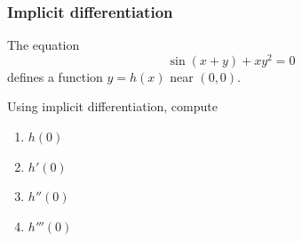 \documentclass[14pt]{beamer}
\begin{document}
	\begin{frame}[t]
		\frametitle{Implicit differentiation}

		The equation
		\[
			\sin (x+y) + xy^{2}= 0
		\]
		defines a function $\displaystyle y=h(x)$ near $(0,0)$. \href{https://www.desmos.com/calculator/bvupq00r6s}{}

		Using implicit differentiation, compute
		\begin{multicols}{4}
			\begin{enumerate}
				\item $\displaystyle h(0)$

				\item $\displaystyle h'(0)$

				\item $\displaystyle h''(0)$

				\item $\displaystyle h'''(0)$
			\end{enumerate}
		\end{multicols}
	\end{frame}


\end{document}
